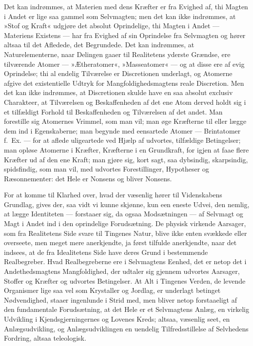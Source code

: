 \documentclass[12pt]{book}
\newcommand{\apage}[1]{\marginnote{\footnotesize\textit{[#1]}}}
\begin{document}
Det kan indrømmes, at Materien med dens Kræfter er fra Evighed af, thi
Magten i Andet er lige saa gammel som Selvmagten; men det kan ikke
indrømmes, at »Stof og Kraft« udgjøre det absolut Oprindelige, thi Magten i
Andet --- Materiens Existens --- har fra Evighed af sin Oprindelse fra
Selvmagten og hører altsaa til det Afledede, det Begrundede. Det kan
indrømmes, at Naturelementerne, naar Delingen gaaer til Realitetens yderste
Grændse, ere tilværende Atomer --- »Ætheratomer«, »Masseatomer« --- og at disse
ere af evig Oprindelse; thi al endelig Tilværelse er Discretionen underlagt,
og Atomerne afgive det existentielle Udtryk for Mangfoldighedsmagtens reale
Discretion. Men det kan ikke indrømmes, at Discretionen skulde have en saa
absolut exclusiv Charakteer, at Tilværelsen og Beskaffenheden af det ene
Atom derved holdt sig i et tilfældigt Forhold til Beskaffenheden og
Tilværelsen af det andet. Man forestille sig Atomernes Vrimmel, som man vil;
man øge Kræfterne til eller lægge dem ind i Egenskaberne; man begynde med
eensartede Atomer --- Brintatomer f.\ Ex. --- for at aflede uligeartede ved Hjælp
af udvortes, tilfældige Betingelser; \apage{221} man opløse Atomerne i Kræfter,
Kræfterne i en Grundkraft, for igjen at faae flere Kræfter ud af den ene
Kraft; man gjøre sig, kort sagt, saa dybsindig, skarpsindig, spidsfindig,
som man vil, med udvortes Forestillinger, Hypotheser og Ræsonnementer: det
Hele er Nonsens og bliver Nonsens.

For at komme til Klarhed over, hvad der væsenlig hører til Videnskabens
Grundlag, gives der, saa vidt vi kunne skjønne, kun een eneste Udvei, den
nemlig, at lægge Identiteten --- forstaaer sig, da ogsaa Modsætningen ---
af Selvmagt og Magt i Andet ind i den oprindelige Forudsætning. De physisk
virkende Aarsager, som fra Realitetens Side svare til Tingenes Natur, blive
ikke enten svækkede eller overseete, men meget mere anerkjendte, ja først
tilfulde anerkjendte, naar det indsees, at de fra Idealitetens Side have
deres Grund i bestemmende Realbegreber. Hvad Realbegreberne ere i
Selvmagtens Eenhed, det er netop det i Andethedsmagtens Mangfoldighed, der
udtaler sig gjennem udvortes Aarsager, Stoffer og Kræfter og udvortes
Betingelser. At Alt i Tingenes Verden, de levende Organismer lige saa vel
som Krystaller og Jordlag, er underlagt betinget Nødvendighed, staaer
ingenlunde i Strid med, men bliver netop forstaaeligt af den fundamentale
Forudsætning, at det Hele er et Selvmagtens Anlæg, en virkelig Udvikling i
Kjendsgjerningernes og Lovenes Kreds; altsaa, væsenlig seet, en
Anlægsudvikling, og Anlægsudviklingen en uendelig Tilfredsstillelse af
Selvhedens Fordring, altsaa teleologisk.
\end{document}
